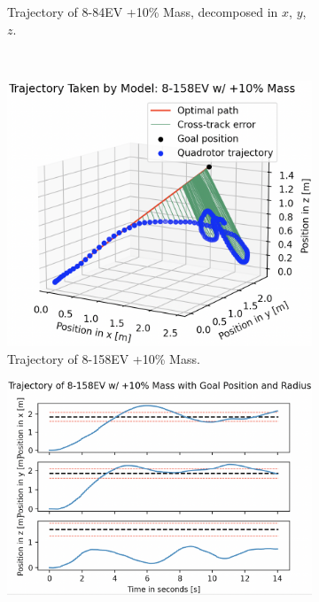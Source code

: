 \begin{figure}[H]
\begin{subfigure}[b]{0.49\textwidth}
         \caption{Trajectory of 8-84EV +10\% Mass, decomposed in $x$, $y$, $z$.}
         \label{fig:testing_robust+10_ppo884EV2}
     \end{subfigure} 
     \hfill \\[1mm]
    \begin{subfigure}[b]{0.48\textwidth}
         \centering
         \captionsetup{justification=centering}
         \includegraphics[width=\textwidth]{figures/5_/Testing/ppo_test_robust+10-8158EV1.png}
         \caption{Trajectory of 8-158EV +10\% Mass.}
         \label{fig:testing_robust+10_ppo8158EV1}
     \end{subfigure} 
     \hfill 
     \begin{subfigure}[b]{0.49\textwidth}
         \centering
         \captionsetup{justification=centering}
         \includegraphics[width=\textwidth]{figures/5_/Testing/ppo_test_robust+10-8158EV2.png}

\end{subfigure}
\end{figure}
